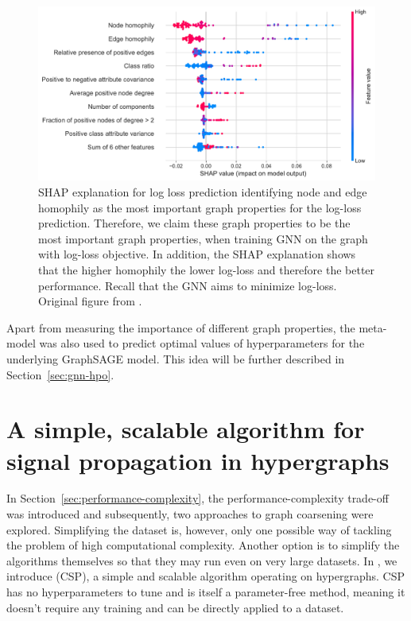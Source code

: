 \begin{figure}
	\includegraphics[width=\linewidth]{images/graph-property-importance.pdf}
	\caption{SHAP explanation for log loss prediction identifying node and edge homophily as the most important graph properties for the log-loss prediction. Therefore, we claim these graph properties to be the most important graph properties, when training GNN on the graph with log-loss objective. In addition, the SHAP explanation shows that the higher homophily the lower log-loss and therefore the better performance. Recall that the GNN aims to minimize log-loss. Original figure from \cite{prochazka_which_2023}.}
	\label{fig:graph-property-importance}
\end{figure}

Apart from measuring the importance of different graph properties, the meta-model was also used to predict optimal values of hyperparameters for the underlying GraphSAGE model. This idea will be further described in Section~\ref{sec:gnn-hpo}.

\section{A simple, scalable algorithm for signal propagation in hypergraphs}
\label{sec:CSP}

In Section~\ref{sec:performance-complexity}, the performance-complexity trade-off was introduced and subsequently, two approaches to graph coarsening were explored. Simplifying the dataset is, however, only one possible way of tackling the problem of high computational complexity. Another option is to simplify the algorithms themselves so that they may run even on very large datasets. In \cite{prochazka_convolutional_2024}, we introduce  (CSP), a simple and scalable algorithm operating on hypergraphs. CSP has no hyperparameters to tune and is itself a parameter-free method, meaning it doesn't require any training and can be directly applied to a dataset.

